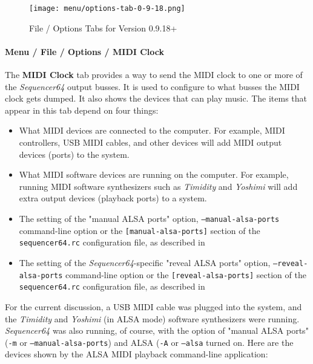 \begin{figure}[H]
   \centering 
   \texttt{[image: menu/options-tab-0-9-18.png]}
   \caption{File / Options Tabs for Version 0.9.18+}
   \label{fig:seq64_options_tab_0_9_18}
\end{figure}

\paragraph{Menu / File / Options / MIDI Clock}
\label{paragraph:seq64_menu_file_options_midi_clock}

   The \textbf{MIDI Clock} tab provides a way to send the MIDI clock to one
   or more of the \textsl{Sequencer64} output busses.
   It is used to configure to what busses the MIDI clock gets dumped.
   It also shows the devices that can play music.
   The items that appear in this tab depend on four things:

   \begin{itemize}
      \item What MIDI devices are connected to the computer.  For example,
         MIDI controllers, USB MIDI cables, and other devices will add MIDI
         output devices (ports) to the system.
      \item What MIDI software devices are running on the computer.
         For example, running MIDI software synthesizers such as
         \textsl{Timidity} and \textsl{Yoshimi} will add extra output devices
         (playback ports) to a system.
      \item The setting of the "manual ALSA ports" option,
         \texttt{--manual-alsa-ports} command-line option or the
         \texttt{[manual-alsa-ports]} section of the
         \texttt{sequencer64.rc} configuration file, as described in
      \item The setting of the \textsl{Sequencer64}-specific
         "reveal ALSA ports" option,
         \texttt{--reveal-alsa-ports} command-line option or the
         \texttt{[reveal-alsa-ports]} section of the
         \texttt{sequencer64.rc} configuration file, as described in
   \end{itemize}

   For the current discussion, a USB MIDI cable was plugged into the system,
   and the \textsl{Timidity} and \textsl{Yoshimi} (in ALSA mode) software
   synthesizers were running.  \textsl{Sequencer64} was also running, of
   course, with the option of "manual ALSA ports" (\texttt{-m} or
   \texttt{--manual-alsa-ports}) and ALSA (\texttt{-A} or
   \texttt{--alsa} turned on.
   Here are the devices shown by the ALSA MIDI playback
   command-line application:

